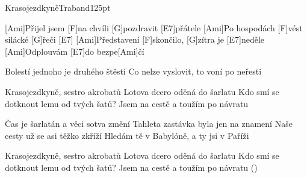 \begin{song}{Krasojezdkyně}{Traband}{125pt}

%
[Ami]Přijel jsem [F]na chvíli [G]pozdravit [E7]přátele
[Ami]Po hospodách [F]vést silácké [G]{}řeči [E7]{}
[Ami]Představení [F]skončilo, [G]zítra je [E7]neděle
[Ami]Odplouvám [E7]do bezpe[Ami]{}čí

Bolestí jednoho je druhého štěstí
Co nelze vyslovit, to voní po neřesti

\chorus%
Krasojezdkyně, sestro akrobatů
Lotova dcero oděná do šarlatu
Kdo smí se dotknout lemu od tvých šatů?
Jsem na cestě a toužím po návratu

%
Čas je šarlatán a věci sotva změní
Tahleta zastávka byla jen na znamení
Naše cesty už se asi těžko zkříží
Hledám tě v Babylóně, a ty jsi v Paříži

\chorus%
Krasojezdkyně, sestro akrobatů
Lotova dcero oděná do šarlatu
Kdo smí se dotknout lemu od tvých šatů?
Jsem na cestě a toužím po návratu
()
\end{song}
